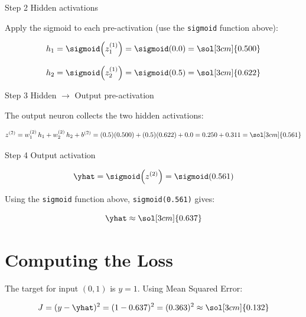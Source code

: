 \documentclass[12pt, a4paper]{article}
\begin{document}
\vspace{0.8em}

\begin{stepbox}{Step 2 \quad Hidden activations}

  Apply the sigmoid to each pre-activation (use the \texttt{sigmoid} function above):

  \[
    h_1 = \sigmoid\!\left(z^{(1)}_1\right) = \sigmoid(0.0) = \sol[3cm]{0.500}
  \]

  \[
    h_2 = \sigmoid\!\left(z^{(1)}_2\right) = \sigmoid(0.5) = \sol[3cm]{0.622}
  \]
\end{stepbox}

\vspace{0.8em}

\begin{stepbox}{Step 3 \quad Hidden $\to$ Output pre-activation}

  The output neuron collects the two hidden activations:

  \[
    z^{(2)}
    = w^{(2)}_1\,h_1 + w^{(2)}_2\,h_2 + b^{(2)}
    = (0.5)(0.500) + (0.5)(0.622) + 0.0
    = 0.250 + 0.311
    = \sol[3cm]{0.561}
  \]
\end{stepbox}

\vspace{0.8em}

\begin{stepbox}{Step 4 \quad Output activation}

  \[
    \yhat = \sigmoid\!\left(z^{(2)}\right) = \sigmoid(0.561)
  \]

  Using the \texttt{sigmoid} function above, \texttt{sigmoid(0.561)} gives:

  \[
    \yhat \approx \sol[3cm]{0.637}
  \]
\end{stepbox}

\section{Computing the Loss}

The target for input $(0,1)$ is $y = 1$.
Using Mean Squared Error:

\[
  J = (y - \yhat)^2 = (1 - 0.637)^2 = (0.363)^2 \approx \sol[3cm]{0.132}
\]
\end{document}

